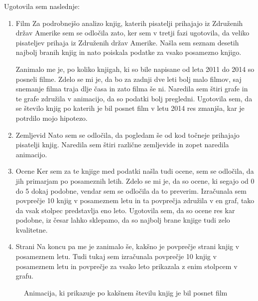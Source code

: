 \documentclass[11pt,a4paper]{article}
\begin{document}
Ugotovila sem naslednje:
\begin{enumerate}

\item{Film}
\newline
Za podrobnejšo analizo knjig, katerih pisatelji prihajajo iz Združenih držav Amerike sem se odločila zato, ker sem v tretji fazi ugotovila, da veliko pisateljev prihaja iz Združenih držav Amerike. Našla sem seznam desetih najbolj branih knjig in nato poiskala podatke za vsako posamezno knjigo. 

Zanimalo me je, po koliko knjigah, ki so bile napisane od leta 2011 do 2014 so posneli filme. Zdelo se mi je, da bo za zadnji dve leti bolj malo filmov, saj snemanje filma traja dlje časa in zato filma še ni. Naredila sem štiri grafe in te grafe združila v animacijo, da so podatki bolj pregledni.  
Ugotovila sem, da se število knjig po katerih je bil posnet film v letu 2014 res zmanjša, kar je potrdilo mojo hipotezo.

\item{Zemljevid}
\newline
Nato sem se odločila, da pogledam še od kod točneje prihajajo pisatelji knjig. Naredila sem štiri različne zemljevide in zopet naredila animacijo. 


\item{Ocene}
\newline
Ker sem za te knjige med podatki našla tudi ocene, sem se odločila, da jih primarjam po posameznih letih. Zdelo se mi je, da so ocene, ki segajo od 0 do 5 dokaj podobne, vendar sem se odločila da to preverim. Izračunala sem povprečje 10 knjig v posameznem letu in ta povprečja združila v en graf, tako da vsak stolpec predstavlja eno leto. Ugotovila sem, da so ocene res kar podobne, iz česar lahko sklepamo, da so najbolj brane knjige tudi zelo kvalitetne. 

\item{Strani}
\newline
Na koncu pa me je zanimalo še, kakšno je povprečje strani knjig v posameznem letu. Tudi tukaj sem izračunala povprečje 10 knjig v posameznem letu in povprečje za vsako leto prikazala z enim stolpcem v grafu. 
\end{enumerate}


\pagebreak
\begin{figure}[H]
\caption{Animacija, ki prikazuje po kakšnem številu knjig je bil posnet film}
\end{figure}
\end{document}
